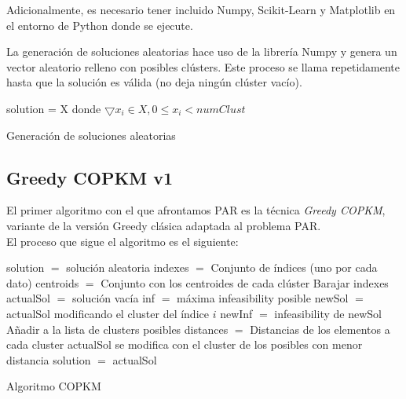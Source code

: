 \vspace{\baselineskip}

Adicionalmente, es necesario tener incluido Numpy, Scikit-Learn y Matplotlib en el entorno de Python donde se ejecute.

\vspace{\baselineskip}

La generación de soluciones aleatorias hace uso de la librería Numpy y genera un vector aleatorio relleno con posibles clústers. Este proceso se llama repetidamente hasta que la solución es válida (no deja ningún clúster vacío). \\

\begin{algorithm}[H]
    \SetAlgoLined
         {
            solution = X donde $\bigtriangledown x_i \in X, 0 \leq x_i < numClust $ \;
        }
    \caption{Generación de soluciones aleatorias}
\end{algorithm}

\newpage


\subsection{Greedy COPKM v1}
El primer algoritmo con el que afrontamos PAR es la técnica \textit{Greedy COPKM}, variante de la versión Greedy clásica adaptada al problema PAR. \\

El proceso que sigue el algoritmo es el siguiente: \\

\begin{algorithm}[H]
    \SetAlgoLined
        solution $=$ solución aleatoria \;
        indexes $=$ Conjunto de índices (uno por cada dato) \;
        centroids $=$ Conjunto con los centroides de cada clúster \;
        Barajar indexes \;
         {
            actualSol $=$ solución vacía \;
             {
                inf $=$ máxima infeasibility posible \;
                 {
                    newSol $=$ actualSol modificando el cluster del índice $i$ \;
                    newInf $=$ infeasibility de newSol \;
                     {
                        Añadir a la lista de clusters posibles \;
                    }
                }
                distances $=$ Distancias de los elementos a cada cluster \;
                actualSol se modifica con el cluster de los posibles con menor distancia \; 
            }
            solution $=$ actualSol \;
        }
    \caption{Algoritmo COPKM}
\end{algorithm}

